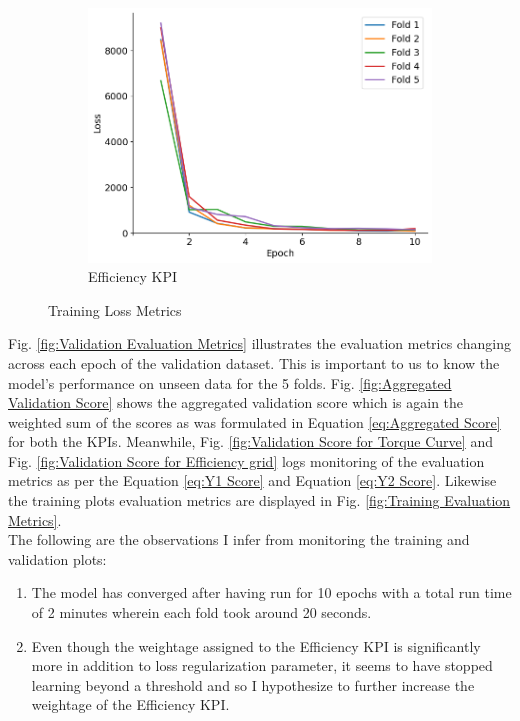 \documentclass{report} %
\begin{document}
\begin{figure}[H]
\begin{subfigure}{0.32\textwidth}
        \centering
        \includegraphics[width=\textwidth]{./ReportImages/train_loss_y2.png}
        \caption{\centering Efficiency \ac{KPI}}
        \label{fig:Training Loss for Efficiency grid}
    \end{subfigure}
    \caption{Training Loss Metrics}
    \label{fig:Training Loss Metrics}
\end{figure}

Fig. \ref{fig:Validation Evaluation Metrics} illustrates the evaluation metrics changing across each epoch of the validation dataset. This is important to us to know 
the model's performance on unseen data for the 5 folds. Fig. \ref{fig:Aggregated Validation Score} shows the aggregated validation score which is again the weighted 
sum of the scores as was formulated in Equation \ref{eq:Aggregated Score} for both the \ac{KPI}s.
Meanwhile, Fig. \ref{fig:Validation Score for Torque Curve} and Fig. \ref{fig:Validation Score for Efficiency grid} logs monitoring of the evaluation metrics as per the 
Equation \ref{eq:Y1 Score} and Equation \ref{eq:Y2 Score}.
Likewise the training plots evaluation metrics are displayed in Fig. \ref{fig:Training Evaluation Metrics}.\\

The following are the observations I infer from monitoring the training and validation plots:

\begin{enumerate}[nosep]
    \item The model has converged after having run for 10 epochs with a total run time of 2 minutes wherein each fold took around 20 seconds.
    \item Even though the weightage assigned to the Efficiency \ac{KPI} is significantly more in addition to loss regularization parameter, it seems to have stopped learning 
    beyond a threshold and so I hypothesize to further increase the weightage of the Efficiency \ac{KPI}.
\end{enumerate}
\end{document}

